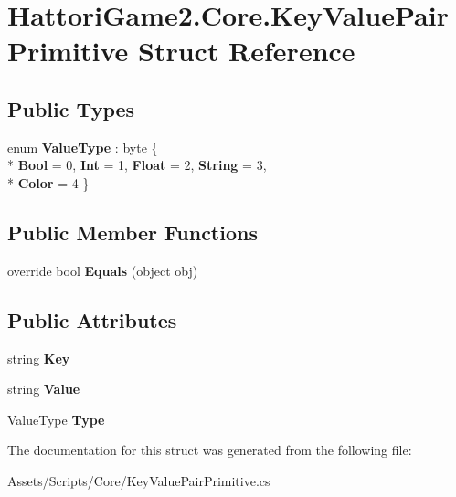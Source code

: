 \hypertarget{struct_hattori_game2_1_1_core_1_1_key_value_pair_primitive}{}\section{Hattori\+Game2.\+Core.\+Key\+Value\+Pair\+Primitive Struct Reference}
\label{struct_hattori_game2_1_1_core_1_1_key_value_pair_primitive}
\subsection*{Public Types}
\begin{DoxyCompactItemize}
\item 
\hypertarget{struct_hattori_game2_1_1_core_1_1_key_value_pair_primitive_ac00c92284fbbb9283af400822ce3c683}{}enum {\bfseries Value\+Type} \+: byte \{ \\*
{\bfseries Bool} = 0, 
{\bfseries Int} = 1, 
{\bfseries Float} = 2, 
{\bfseries String} = 3, 
\\*
{\bfseries Color} = 4
 \}\label{struct_hattori_game2_1_1_core_1_1_key_value_pair_primitive_ac00c92284fbbb9283af400822ce3c683}

\end{DoxyCompactItemize}
\subsection*{Public Member Functions}
\begin{DoxyCompactItemize}
\item 
\hypertarget{struct_hattori_game2_1_1_core_1_1_key_value_pair_primitive_ad57ca3339b3690fd6b305470f19789f5}{}override bool {\bfseries Equals} (object obj)\label{struct_hattori_game2_1_1_core_1_1_key_value_pair_primitive_ad57ca3339b3690fd6b305470f19789f5}

\end{DoxyCompactItemize}
\subsection*{Public Attributes}
\begin{DoxyCompactItemize}
\item 
\hypertarget{struct_hattori_game2_1_1_core_1_1_key_value_pair_primitive_aab8262896fb0e1f9cc09cf0adbbbd9e1}{}string {\bfseries Key}\label{struct_hattori_game2_1_1_core_1_1_key_value_pair_primitive_aab8262896fb0e1f9cc09cf0adbbbd9e1}

\item 
\hypertarget{struct_hattori_game2_1_1_core_1_1_key_value_pair_primitive_a1213cc2d3614d2f1d8c6fe3215b1d7ee}{}string {\bfseries Value}\label{struct_hattori_game2_1_1_core_1_1_key_value_pair_primitive_a1213cc2d3614d2f1d8c6fe3215b1d7ee}

\item 
\hypertarget{struct_hattori_game2_1_1_core_1_1_key_value_pair_primitive_ae7c839752c390bc0fa1e3631b1116126}{}Value\+Type {\bfseries Type}\label{struct_hattori_game2_1_1_core_1_1_key_value_pair_primitive_ae7c839752c390bc0fa1e3631b1116126}

\end{DoxyCompactItemize}


The documentation for this struct was generated from the following file\+:\begin{DoxyCompactItemize}
\item 
Assets/\+Scripts/\+Core/Key\+Value\+Pair\+Primitive.\+cs\end{DoxyCompactItemize}
